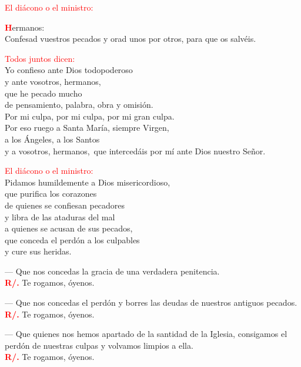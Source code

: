 \documentclass[12pt, letterpaper]{report}
\begin{document}
\large {\textcolor{red}{El di\'acono o el ministro:}}

\lettrine[lines=2]{\bfseries \textcolor{red}{H}}{}\Large {ermanos:\\ 
Confesad vuestros pecados y orad unos por otros, para que os salv\'eis.}

\large {\textcolor{red}{Todos juntos dicen:}}\\
\noindent
\Large {Yo confieso ante Dios todopoderoso\\
y ante vosotros, hermanos,\\
que he pecado mucho\\
de pensamiento, palabra, obra y omisi\'on.\\
Por mi culpa, por mi culpa, por mi gran culpa.\\
Por eso ruego a Santa Mar\'ia, siempre Virgen,\\
a los \'Angeles, a los Santos\\
y a vosotros, hermanos,\
que interced\'ais por m\'i ante Dios nuestro Se\~nor.}

\large {\textcolor{red}{El di\'acono o el ministro:}}\\
\noindent
\Large {Pidamos humildemente a Dios misericordioso,\\
que purifica los corazones\\
de quienes se confiesan pecadores\\
y libra de las ataduras del mal\\
a quienes se acusan de sus pecados,\\
que conceda el perd\'on a los culpables\\
y cure sus heridas.}

--- Que nos concedas la gracia de una verdadera penitencia.\\
\noindent
\Large {\bfseries \textcolor{red}{R/.}} \hspace{0.5cm} Te rogamos, \'oyenos.

--- Que nos concedas el perd\'on y borres las deudas de nuestros antiguos pecados.\\
\noindent
\Large {\bfseries \textcolor{red}{R/.}} \hspace{0.5cm} Te rogamos, \'oyenos.

--- Que quienes nos hemos apartado de la santidad de la Iglesia,
consigamos el perd\'on de nuestras culpas y volvamos limpios a ella.\\
\noindent
\Large {\bfseries \textcolor{red}{R/.}} \hspace{0.5cm} Te rogamos, \'oyenos.
\end{document}
